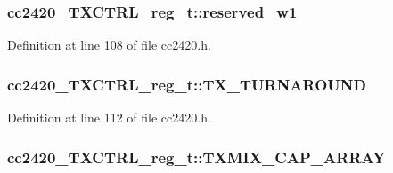 \subsubsection[{\texorpdfstring{reserved\+\_\+w1}{reserved_w1}}]{ cc2420\+\_\+\+T\+X\+C\+T\+R\+L\+\_\+reg\+\_\+t\+::reserved\+\_\+w1}\hypertarget{structcc2420___t_x_c_t_r_l__reg__t_aa832778efdb3dfc0ccaf7c43d8792461}{}\label{structcc2420___t_x_c_t_r_l__reg__t_aa832778efdb3dfc0ccaf7c43d8792461}


Definition at line 108 of file cc2420.\+h.

\subsubsection[{\texorpdfstring{T\+X\+\_\+\+T\+U\+R\+N\+A\+R\+O\+U\+ND}{TX_TURNAROUND}}]{ cc2420\+\_\+\+T\+X\+C\+T\+R\+L\+\_\+reg\+\_\+t\+::\+T\+X\+\_\+\+T\+U\+R\+N\+A\+R\+O\+U\+ND}\hypertarget{structcc2420___t_x_c_t_r_l__reg__t_a22b1f2cc14f436f4a84eaba3549abc25}{}\label{structcc2420___t_x_c_t_r_l__reg__t_a22b1f2cc14f436f4a84eaba3549abc25}


Definition at line 112 of file cc2420.\+h.

\subsubsection[{\texorpdfstring{T\+X\+M\+I\+X\+\_\+\+C\+A\+P\+\_\+\+A\+R\+R\+AY}{TXMIX_CAP_ARRAY}}]{ cc2420\+\_\+\+T\+X\+C\+T\+R\+L\+\_\+reg\+\_\+t\+::\+T\+X\+M\+I\+X\+\_\+\+C\+A\+P\+\_\+\+A\+R\+R\+AY}\hypertarget{structcc2420___t_x_c_t_r_l__reg__t_a4e7027febd2562c5cea00c343ca41aba}{}\label{structcc2420___t_x_c_t_r_l__reg__t_a4e7027febd2562c5cea00c343ca41aba}


